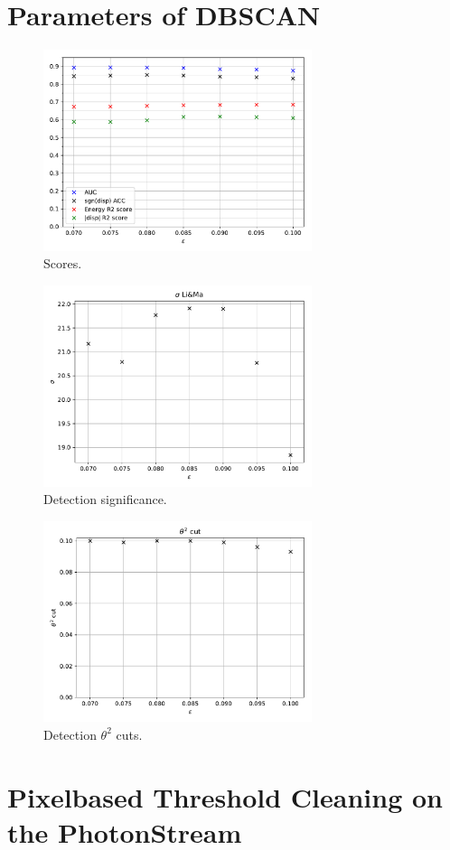 \section{Parameters of DBSCAN}
%
\begin{figure}
  \centering
  \includegraphics[width=0.7\textwidth]{Plots/Epsilon/eps_scores.pdf}
  \caption{Scores.}
  \label{fig:eps_scores}
\end{figure}
%
\begin{figure}
  \centering
  \includegraphics[width=0.7\textwidth]{Plots/Epsilon/eps_sigma.pdf}
  \caption{Detection significance.}
  \label{fig:eps_sigma}
\end{figure}
%
\begin{figure}
  \centering
  \includegraphics[width=0.7\textwidth]{Plots/Epsilon/eps_theta_cut.pdf}
  \caption{Detection $\theta^2$ cuts.}
  \label{fig:eps_theta}
\end{figure}

\section{Pixelbased Threshold Cleaning on the PhotonStream}
%
